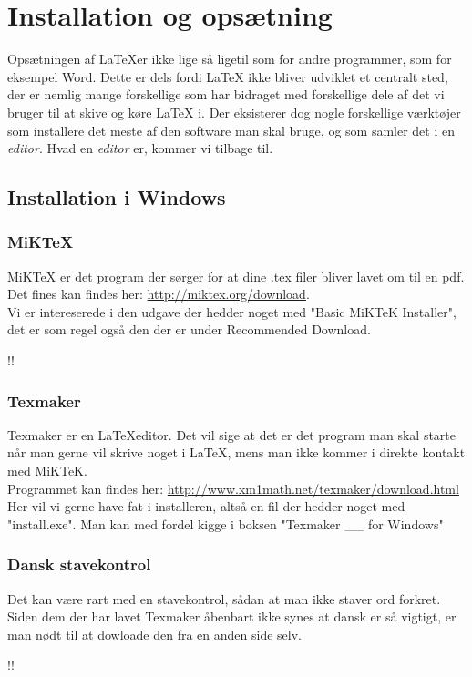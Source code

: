 \section{Installation og opsætning}
Opsætningen af \LaTeX er ikke lige så ligetil som for andre programmer, som for eksempel Word.
Dette er dels fordi \LaTeX{} ikke bliver udviklet et centralt sted,
der er nemlig mange forskellige som har bidraget med forskellige dele af det vi bruger til at skive og køre \LaTeX{} i.
Der eksisterer dog nogle forskellige værktøjer som installere det meste af den software man skal bruge,
og som samler det i en \textit{editor}.
Hvad en \textit{editor} er, kommer vi tilbage til.

\subsection{Installation i Windows}
\subsubsection{MiKTeX}
MiKTeX er det program der sørger for at dine .tex filer bliver lavet om til en pdf.\\
Det fines kan findes her: \url{http://miktex.org/download}.\\
Vi er intereserede i den udgave der hedder noget med "Basic MiKTeK Installer",
det er som regel også den der er under Recommended Download.

!!

\subsubsection{Texmaker}
Texmaker er en \LaTeX editor.
Det vil sige at det er det program man skal starte når man gerne vil skrive noget i \LaTeX,
mens man ikke kommer i direkte kontakt med MiKTeK.\\
Programmet kan findes her: \url{http://www.xm1math.net/texmaker/download.html}\\
Her vil vi gerne have fat i installeren, altså en fil der hedder noget med "install.exe".
Man kan med fordel kigge i boksen "Texmaker \_\_ for Windows"

\subsubsection{Dansk stavekontrol}
Det kan være rart med en stavekontrol, sådan at man ikke staver ord forkret. %
Siden dem der har lavet Texmaker åbenbart ikke synes at dansk er så vigtigt,
er man nødt til at dowloade den fra en anden side selv.

!!

\pagebreak
